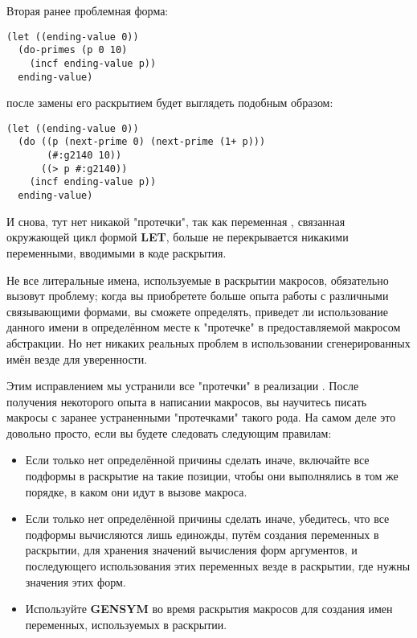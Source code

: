 Вторая ранее проблемная форма:

\begin{lstlisting}
(let ((ending-value 0))
  (do-primes (p 0 10)
    (incf ending-value p))
  ending-value)
\end{lstlisting}

после замены  его раскрытием будет выглядеть подобным образом:

\begin{lstlisting}
(let ((ending-value 0))
  (do ((p (next-prime 0) (next-prime (1+ p)))
       (#:g2140 10))
      ((> p #:g2140))
    (incf ending-value p))
  ending-value)
\end{lstlisting}

И снова, тут нет никакой "протечки", так как переменная , связанная
окружающей цикл  формой \textbf{LET}, больше не перекрывается никакими
переменными, вводимыми в коде раскрытия.

Не все литеральные имена, используемые в раскрытии макросов, обязательно вызовут проблему;
когда вы приобретете больше опыта работы с различными связывающими формами, вы сможете
определять, приведет ли использование данного имени в определённом месте к "протечке" в
предоставляемой макросом абстракции. Но нет никаких реальных проблем в использовании
сгенерированных имён везде для уверенности.

Этим исправлением мы устранили все "протечки" в реализации . После
получения некоторого опыта в написании макросов, вы научитесь писать макросы с заранее
устраненными "протечками" такого рода. На самом деле это довольно просто, если вы будете
следовать следующим правилам:
\begin{itemize}
\item Если только нет определённой причины сделать иначе, включайте все подформы в
  раскрытие на такие позиции, чтобы они выполнялись в том же порядке, в каком они идут в
  вызове макроса.
\item Если только нет определённой причины сделать иначе, убедитесь, что все подформы
  вычисляются лишь единожды, путём создания переменных в раскрытии, для хранения значений
  вычисления форм аргументов, и последующего использования этих переменных везде в
  раскрытии, где нужны значения этих форм.
\item Используйте \textbf{GENSYM} во время раскрытия макросов для создания имен
  переменных, используемых в раскрытии.
\end{itemize}

